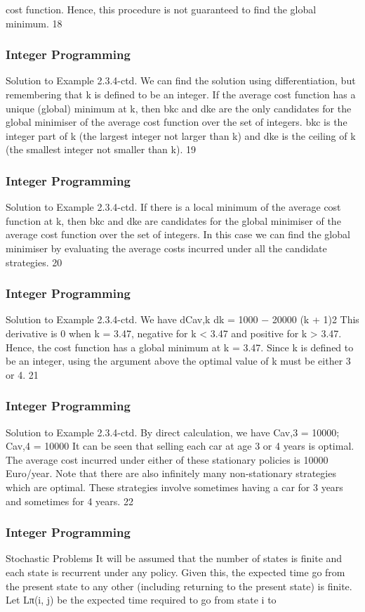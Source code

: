 \begin{frame}
cost function. Hence, this procedure is not
guaranteed to find the global minimum.
18 \end{frame}  \begin{frame} \frametitle{Integer Programming}     
Solution to Example 2.3.4-ctd.
We can find the solution using differentiation, but remembering
that k is defined to be an integer.
If the average cost function has a unique (global) minimum at k,
then bkc and dke are the only candidates for the global minimiser
of the average cost function over the set of integers.
bkc is the integer part of k (the largest integer not larger than k)
and dke is the ceiling of k (the smallest integer not smaller than k).
19 \end{frame}  \begin{frame} \frametitle{Integer Programming}     
Solution to Example 2.3.4-ctd.
If there is a local minimum of the average cost function at k,
then bkc and dke are candidates for the global minimiser of the
average cost function over the set of integers.
In this case we can find the global minimiser by evaluating the
average costs incurred under all the candidate strategies.
20 \end{frame}  \begin{frame} \frametitle{Integer Programming}     
Solution to Example 2.3.4-ctd.
We have
dCav,k
dk = 1000 −
20000
(k + 1)2
This derivative is 0 when k = 3.47, negative for k < 3.47 and
positive for k > 3.47. Hence, the cost function has a global
minimum at k = 3.47.
Since k is defined to be an integer, using the argument above the
optimal value of k must be either 3 or 4.
21 \end{frame}  \begin{frame} \frametitle{Integer Programming}     
Solution to Example 2.3.4-ctd.
By direct calculation, we have
Cav,3 = 10000; Cav,4 = 10000
It can be seen that selling each car at age 3 or 4 years is optimal.
The average cost incurred under either of these stationary policies
is 10000 Euro/year.
Note that there are also infinitely many non-stationary strategies
which are optimal. These strategies involve sometimes having a car
for 3 years and sometimes for 4 years.
22 \end{frame}  \begin{frame} \frametitle{Integer Programming}     
Stochastic Problems
It will be assumed that the number of states is finite and each
state is recurrent under any policy.
Given this, the expected time go from the present state to any
other (including returning to the present state) is finite.
Let Lπ(i, j) be the expected time required to go from state i to

\end{frame}

